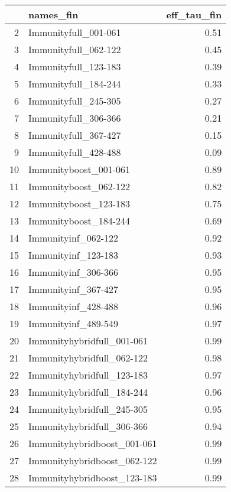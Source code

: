\begin{table}[ht]
\centering
\begin{tabular}{rlr}
  \hline
 & names\_fin & eff\_tau\_fin \\ 
  \hline
2 & Immunityfull\_001-061 & 0.51 \\ 
  3 & Immunityfull\_062-122 & 0.45 \\ 
  4 & Immunityfull\_123-183 & 0.39 \\ 
  5 & Immunityfull\_184-244 & 0.33 \\ 
  6 & Immunityfull\_245-305 & 0.27 \\ 
  7 & Immunityfull\_306-366 & 0.21 \\ 
  8 & Immunityfull\_367-427 & 0.15 \\ 
  9 & Immunityfull\_428-488 & 0.09 \\ 
  10 & Immunityboost\_001-061 & 0.89 \\ 
  11 & Immunityboost\_062-122 & 0.82 \\ 
  12 & Immunityboost\_123-183 & 0.75 \\ 
  13 & Immunityboost\_184-244 & 0.69 \\ 
  14 & Immunityinf\_062-122 & 0.92 \\ 
  15 & Immunityinf\_123-183 & 0.93 \\ 
  16 & Immunityinf\_306-366 & 0.95 \\ 
  17 & Immunityinf\_367-427 & 0.95 \\ 
  18 & Immunityinf\_428-488 & 0.96 \\ 
  19 & Immunityinf\_489-549 & 0.97 \\ 
  20 & Immunityhybridfull\_001-061 & 0.99 \\ 
  21 & Immunityhybridfull\_062-122 & 0.98 \\ 
  22 & Immunityhybridfull\_123-183 & 0.97 \\ 
  23 & Immunityhybridfull\_184-244 & 0.96 \\ 
  24 & Immunityhybridfull\_245-305 & 0.95 \\ 
  25 & Immunityhybridfull\_306-366 & 0.94 \\ 
  26 & Immunityhybridboost\_001-061 & 0.99 \\ 
  27 & Immunityhybridboost\_062-122 & 0.99 \\ 
  28 & Immunityhybridboost\_123-183 & 0.99 \\ 
   \hline
\end{tabular}
\end{table}
